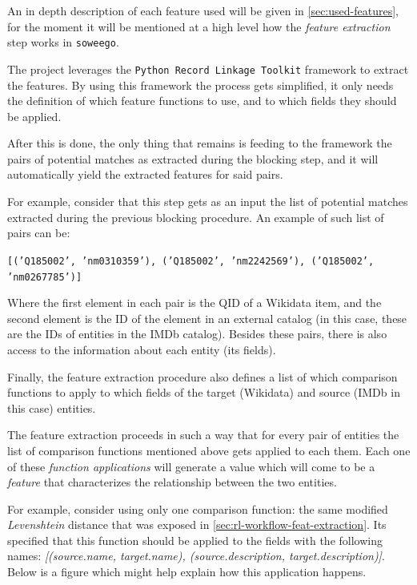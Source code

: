 \documentclass[epsfig,a4paper,11pt,titlepage,twoside,openany]{book}
\begin{document}
An in depth description of each feature used will be given in \autoref{sec:used-features}, for the moment it will be mentioned at a high level how the \textit{feature extraction} step works in \texttt{soweego}. 

The project leverages the \texttt{Python Record Linkage Toolkit} \cite{recordlinkage-library} framework to extract the features. By using this framework the process gets simplified, it only needs the definition of which feature functions to use, and to which fields they should be applied. 



After this is done, the only thing that remains is feeding to the framework the pairs of potential matches as extracted during the blocking step, and it will automatically yield the extracted features for said pairs.

For example, consider that this step gets as an input the list of potential matches extracted during the previous blocking procedure. An example of such list of pairs can be: 

\begin{center}
    \texttt{[('Q185002', 'nm0310359'), ('Q185002', 'nm2242569'), ('Q185002', 'nm0267785')]}
\end{center}

Where the first element in each pair is the QID of a Wikidata item, and the second element is the ID of the element in an external catalog (in this case, these are the IDs of entities in the IMDb catalog). Besides these pairs, there is also access to the information about each entity (its fields). 



Finally, the feature extraction procedure also defines a list of which comparison functions to apply to which fields of the target (Wikidata) and source (IMDb in this case) entities.

The feature extraction proceeds in such a way that for every pair of entities the list of comparison functions mentioned above gets applied to each them. Each one of these \textit{function applications} will generate a value which will come to be a \textit{feature} that characterizes the relationship between the two entities.

For example, consider using only one comparison function: the same modified \textit{Levenshtein} distance that was exposed in \autoref{sec:rl-workflow-feat-extraction}. Its specified that this function should be applied to the fields with the following names: \textit{[(source.name, target.name), (source.description, target.description)]}. Below is a figure which might help explain how this application happens.
\end{document}
